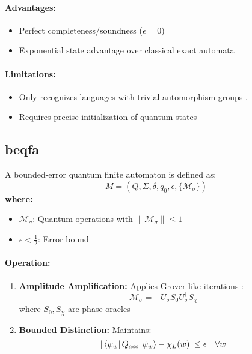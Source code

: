 \paragraph{Advantages:}
\begin{itemize}
    \item Perfect completeness/soundness ($\epsilon = 0$)
    \item Exponential state advantage over classical exact automata
\end{itemize}

\paragraph{Limitations:}
\begin{itemize}
    \item Only recognizes languages with trivial automorphism groups \cite{brodsky2001}.
    \item Requires precise initialization of quantum states
\end{itemize}

\subsection{\acrfull{beqfa}}
\label{subsec:beqfa}

\begin{definition}
A bounded-error quantum finite automaton is defined as:
\[
M = (Q, \Sigma, \delta, q_0, \epsilon, \{\mathcal{M}_\sigma\})
\]
\textbf{where:}
\begin{itemize}
    \item $\mathcal{M}_\sigma$: Quantum operations with $\|\mathcal{M}_\sigma\| \leq 1$
    \item $\epsilon < \frac{1}{2}$: Error bound
\end{itemize}
\end{definition}

\paragraph{Operation:}
\begin{enumerate}
    \item \textbf{Amplitude Amplification:} Applies Grover-like iterations \cite{grover1996fast, ambainis2002quantum}:
    \[
    \mathcal{M}_\sigma = -U_\sigma S_0 U_\sigma^\dagger S_\chi
    \]
    where $S_0, S_\chi$ are phase oracles
    \item \textbf{Bounded Distinction:} Maintains:
    \[
    |\bra{\psi_w}Q_{acc}\ket{\psi_w} - \chi_L(w)| \leq \epsilon \quad \forall w
    \]
\end{enumerate}

